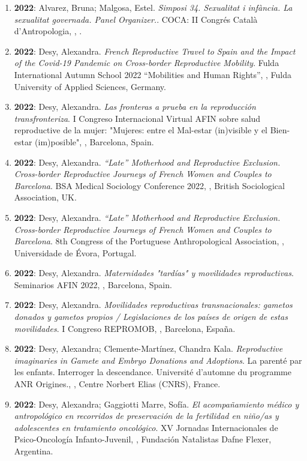 \begin{enumerate}
\item {\bf 2022}: Alvarez, Bruna; Malgosa, Estel. {\it Simposi 34. Sexualitat i infància. La sexualitat governada. Panel Organizer.}. COCA: II Congrés Català d’Antropologia, , .\filbreak
\item {\bf 2022}: Desy, Alexandra. {\it French Reproductive Travel to Spain and the Impact of the Covid-19 Pandemic on Cross-border Reproductive Mobility}. Fulda International Autumn School 2022 “Mobilities and Human Rights”, , Fulda University of Applied Sciences, Germany.\filbreak
\item {\bf 2022}: Desy, Alexandra. {\it Las fronteras a prueba en la reproducción transfronteriza}. I Congreso Internacional Virtual AFIN sobre salud reproductive de la mujer: "Mujeres: entre el Mal-estar (in)visible y el Bien-estar (im)posible", , Barcelona, Spain.\filbreak
\item {\bf 2022}: Desy, Alexandra. {\it “Late” Motherhood and Reproductive Exclusion. Cross-border Reproductive Journeys of French Women and Couples to Barcelona}. BSA Medical Sociology Conference 2022, , British Sociological Association, UK.\filbreak
\item {\bf 2022}: Desy, Alexandra. {\it “Late” Motherhood and Reproductive Exclusion. Cross-border Reproductive Journeys of French Women and Couples to Barcelona}. 8th Congress of the Portuguese Anthropological Association, , Universidade de Évora, Portugal.\filbreak
\item {\bf 2022}: Desy, Alexandra. {\it Maternidades "tardías" y movilidades reproductivas}. Seminarios AFIN 2022, , Barcelona, Spain.\filbreak
\item {\bf 2022}: Desy, Alexandra. {\it Movilidades reproductivas transnacionales: gametos donados y gametos propios / Legislaciones de los países de origen de estas movilidades}. I Congreso REPROMOB, , Barcelona, España.\filbreak
\item {\bf 2022}: Desy, Alexandra; Clemente-Martínez, Chandra Kala. {\it Reproductive imaginaries in Gamete and Embryo Donations and Adoptions}. La parenté par les enfants. Interroger la descendance. Université d’automne du programme ANR Origines., , Centre Norbert Elias (CNRS), France.\filbreak
\item {\bf 2022}: Desy, Alexandra; Gaggiotti Marre, Sofía. {\it El acompañamiento médico y antropológico en recorridos de preservación de la fertilidad en niño/as y adolescentes en tratamiento oncológico}. XV Jornadas Internacionales de Psico-Oncología Infanto-Juvenil, , Fundación Natalistas Dafne Flexer, Argentina.\filbreak

\end{enumerate}
